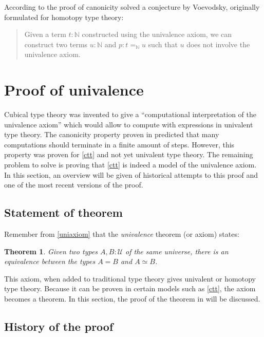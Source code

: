 \documentclass[11pt,a4paper,twoside,xetex,draft]{book}
\newcommand{\keyword}[1]{\emph{#1}\index{#1}}
\newtheorem{theorem}{Theorem}[section]
\begin{document}
According to \cite{Brunerie2018} the proof of canonicity solved a conjecture by Voevodsky, originally formulated for homotopy type theory:


\begin{quotation}
Given a term $t: \mathbb{N}$ constructed using the univalence axiom, we can construct two terms $u : \mathbb{N}$ and $p : t =_{\mathbb{N}} u$ such that $u$ does not involve the univalence axiom.
\end{quotation}

\section{Proof of univalence}\label{univalenceproof}

Cubical type theory was invented to give a ``computational interpretation of the univalence axiom'' which would allow to compute with expressions in univalent type theory. The canonicity property proven in \cite{Brunerie2018} predicted that many computations should terminate in a finite amount of steps. However, this property was proven for \cref{ctt} and not yet univalent type theory. The remaining problem to solve is proving that \cref{ctt} is indeed a model of the univalence axiom. In this section, an overview will be given of historical attempts to this proof and one of the most recent versions of the proof.


\subsection{Statement of theorem}

Remember from \cref{uniaxiom} that the \keyword{univalence} theorem (or axiom) states:

\begin{theorem}
 Given two types $A, B : \mathcal{U}$ of the same universe, there is an equivalence between the types $A = B$ and $A \simeq B$.
 \end{theorem}

This axiom, when added to traditional type theory gives univalent or homotopy type theory. Because it can be proven in certain models such as \cref{ctt}, the axiom becomes a theorem. In this section, the proof of the theorem in \cite{Moertberg2018} will be discussed.

\subsection{History of the proof}
\end{document}
